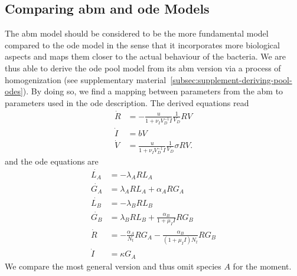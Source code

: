 \documentclass[10pt,A4paper]{article}
\numberwithin{equation}{section}
\begin{document}
\subsection{Comparing \acs{abm} and \acs{ode} Models}
The \ac{abm} model should be considered to be the more fundamental model compared to the \ac{ode} model in the sense that it incorporates more biological aspects and maps them closer to the actual behaviour of the bacteria.
We are thus able to derive the \ac{ode} pool model from its \ac{abm} version via a process of homogenization (see supplementary material~\ref{subsec:supplement-deriving-pool-odes}).
By doing so, we find a mapping between parameters from the \ac{abm} to parameters used in the \ac{ode} description.
The derived equations read
\begin{align}
    \dot{R} &= -\frac{u}{1+\nu_I V_D^{-1}I} \frac{1}{V_D} R V\\
    \dot{I} &= b V\\
    \dot{V} &= \frac{u}{1+\nu_I V_D^{-1} I} \frac{1}{V_D}\sigma R V.
\end{align}
and the \ac{ode} equations are
\begin{align}
    \dot{L_A} &= -\lambda_A R L_A\\
    \dot{G_A} &= \lambda_A R L_A + \alpha_A R G_A\\
    \dot{L_B} &= -\lambda_B R L_B\\
    \dot{G_B} &= \lambda_B R L_B + \frac{\alpha_B}{1 + \mu_I I} R G_B\\
    \dot{R} &= -\frac{\alpha_A}{N_t} R G_A-\frac{\alpha_B}{(1 + \mu_I I) N_t} R G_B \\
    \dot{I} &= \kappa G_A
\end{align}
We compare the most general version and thus omit species $A$ for the moment.
\end{document}

